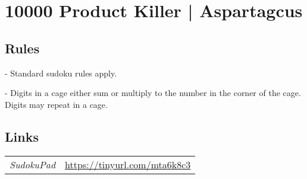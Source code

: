 \section[10000 Product Killer | Aspartagcus {[\emph{Product Killer Sudoku}]}]{10000 Product Killer | {\normalfont Aspartagcus}}
\label{sec:53-10000-product-killer-aspartagcus}

\subsection*{Rules}
\begin{markdown}
- Standard sudoku rules apply.

- Digits in a cage either sum or multiply to the number in the corner of the cage. Digits may repeat in a cage.
\end{markdown}
\subsection*{Links}
\begin{tabularx}{\textwidth}{l X}
\emph{SudokuPad} & \url{https://tinyurl.com/mta6k8c3} \\
\end{tabularx}
\pagebreak
